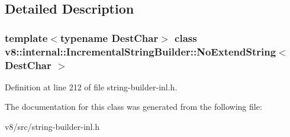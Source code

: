 \subsection{Detailed Description}
\subsubsection*{template$<$typename Dest\+Char$>$\newline
class v8\+::internal\+::\+Incremental\+String\+Builder\+::\+No\+Extend\+String$<$ Dest\+Char $>$}



Definition at line 212 of file string-\/builder-\/inl.\+h.



The documentation for this class was generated from the following file\+:\begin{DoxyCompactItemize}
\item 
v8/src/string-\/builder-\/inl.\+h\end{DoxyCompactItemize}
